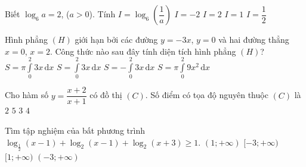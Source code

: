 \begin{ex}%
	Biết $\log_6 a=2$, ($a>0$). Tính $I=\log_6 \left(\dfrac{1}{a}\right)$
	\choice
	{\True $I=-2$}
	{$I=2$}
	{$I=1$}
	{$I=\dfrac{1}{2}$}
\end{ex}
\begin{ex}%
	Hình phẳng $(H)$ giới hạn bởi các đường $y=-3x$, $y=0$ và hai đường thẳng $x=0$, $x=2$. Công thức nào sau đây tính diện tích hình phẳng $(H)$?
	\choice
	{$S=\pi\displaystyle\int\limits_0^2 3x\mathrm{\,d}x$}
	{\True $S=\displaystyle\int\limits_0^2 3x\mathrm{\,d}x$}
	{$S=-\displaystyle\int\limits_0^2 3x\mathrm{\,d}x$}
	{$S=\pi\displaystyle\int\limits_0^2 9x^2\mathrm{\,d}x$}
\end{ex}
\begin{ex}%
	Cho hàm số $y=\dfrac{x+2}{x+1}$ có đồ thị $(C)$. Số điểm có tọa độ nguyên thuộc $(C)$ là
	\choice
	{\True $2$}
	{$5$}
	{$3$}
	{$4$}
\end{ex}
\begin{ex}%
	Tìm tập nghiệm của bất phương trình $\log_{\frac{1}{2}}(x-1)+\log_2 (x-1)+\log_2 (x+3)\ge 1$.
	\choice
	{\True $(1;+\infty)$}
	{$[-3;+\infty)$}
	{$[1;+\infty)$}
	{$(-3;+\infty)$}
\end{ex}
